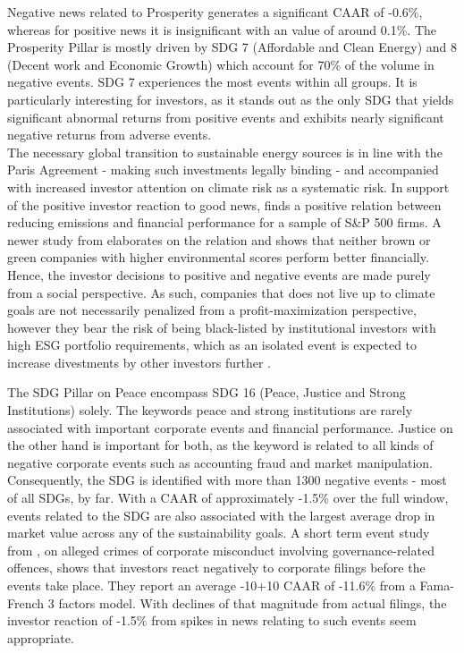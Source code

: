 Negative news related to Prosperity generates a significant CAAR of -0.6\%, whereas for positive news it is insignificant with an value of around 0.1\%. The Prosperity Pillar is mostly driven by SDG 7 (Affordable and Clean Energy) and 8 (Decent work and Economic Growth) which account for 70\% of the volume in negative events. SDG 7 experiences the most events within all groups. It is particularly interesting for investors, as it stands out as the only SDG that yields significant abnormal returns from positive events and exhibits nearly significant negative returns from adverse events.\\
The necessary global transition to sustainable energy sources is in line with the Paris Agreement - making such investments legally binding - and accompanied with increased investor attention on climate risk as a systematic risk. In support of the positive investor reaction to good news, \cite{hart1996does} finds a positive relation between reducing emissions and financial performance for a sample of S\&P 500 firms. A newer study from \cite{paytobegreen} elaborates on the relation and shows that neither brown or green companies with higher environmental scores perform better financially. Hence, the investor decisions to positive and negative events are made purely from a social perspective. As such, companies that does not live up to climate goals are not necessarily penalized from a profit-maximization perspective, however they bear the risk of being black-listed by institutional investors with high ESG portfolio requirements, which as an isolated event is expected to increase divestments by other investors further \cite{dell2021norwegian}. 

The SDG Pillar on Peace encompass SDG 16 (Peace, Justice and Strong Institutions) solely. The keywords peace and strong institutions are rarely associated with important corporate events and financial performance. Justice on the other hand is important for both, as the keyword is related to all kinds of negative corporate events such as accounting fraud and market manipulation. Consequently, the SDG is identified with more than 1300 negative events - most of all SDGs, by far. With a CAAR of approximately -1.5\% over the full window, events related to the SDG are also associated with the largest average drop in market value across any of the sustainability goals. A short term event study from \cite{bauer2010misdeeds}, on alleged crimes of corporate misconduct involving governance-related offences, shows that investors react negatively to corporate filings before the events take place. They report an average -10\/+10 CAAR of -11.6\% from a Fama-French 3 factors model. With declines of that magnitude from actual filings, the investor reaction of -1.5\% from spikes in news relating to such events seem appropriate. 

